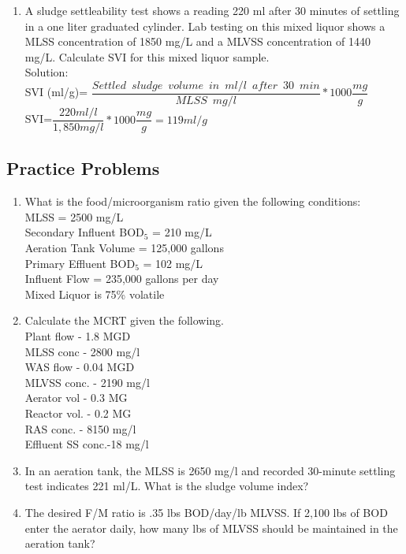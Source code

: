 \begin{enumerate}
\item A sludge settleability test shows a reading 220 ml after 30 minutes of settling in a one liter graduated cylinder. Lab testing on this mixed liquor shows a MLSS concentration of 1850 mg/L and a MLVSS concentration of 1440 mg/L. Calculate SVI for this mixed liquor sample.\\

Solution:\\
SVI (ml/g)= $\dfrac{Settled \enspace sludge \enspace volume \enspace in \enspace ml/l \enspace after \enspace 30 \enspace min}{MLSS \enspace mg/l}*1000 \dfrac{mg}{g}$\\
\vspace{0.5cm}
SVI=$\dfrac{220ml/l}{1,850mg/l}*1000\dfrac{mg}{g}=\boxed{119ml/g}$


\end{enumerate}

\subsection{Practice Problems} 

\begin{enumerate}

\item What is the food/microorganism ratio given the following conditions:\\
MLSS = 2500 mg/L\\
Secondary Influent BOD$_5$ = 210 mg/L\\
Aeration Tank Volume = 125,000 gallons\\
Primary Effluent BOD$_5$ = 102 mg/L\\
Influent Flow = 235,000 gallons per day\\
Mixed Liquor is 75\% volatile\\

\item Calculate the MCRT given the following.\\
Plant flow - 1.8 MGD\\
MLSS conc -  2800 mg/l\\
WAS flow - 0.04 MGD\\
MLVSS conc. - 2190 mg/l\\
Aerator vol - 0.3 MG\\
Reactor vol. - 0.2 MG\\
RAS conc. - 8150 mg/l\\
Effluent SS conc.-18 mg/l\\

\item In an aeration tank, the MLSS is 2650 mg/l and recorded 30-minute settling test indicates 221 ml/L.  What is the sludge volume index?\\

\item The desired F/M ratio is .35 lbs BOD/day/lb MLVSS. If 2,100 lbs of BOD enter the aerator daily, how many lbs of MLVSS should be maintained in the aeration tank?\\


\end{enumerate}






